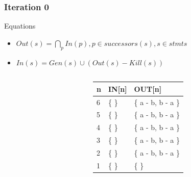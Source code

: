 \begin{frame}[fragile, t]
	\frametitle{Iteration 0} 
	
	\begin{center}
		\begin{scriptsize}
			\begin{minipage}{8cm}
				\begin{block}{Equations}
					\begin{itemize}
						\item $Out(s) = \bigcap_p In(p), p \in successors(s), s \in stmts$
						\item $In(s) = Gen(s) \cup (Out(s) - Kill(s))$  
					\end{itemize}
				\end{block}
			\end{minipage}
		\end{scriptsize}
	\end{center}
	
	\begin{columns}[T]
		\begin{column}[T]{.5\textwidth}
			\vspace{0pt}
			
		\end{column}
		\begin{column}[T]{.5\textwidth}
			\vspace{30pt}    
			\begin{scriptsize}
				\begin{table}[]
					\begin{tabular}{|l|l|l|}
						\hline
						n & IN{[}n{]} & OUT{[}n{]} \\ \hline
						6  & \{ \} & \{ a - b, b - a \}  \\ \hline
						5  & \{ \} & \{ a - b, b - a \}  \\ \hline
						4  & \{ \} & \{ a - b, b - a \}  \\ \hline
						3  & \{ \} & \{ a - b, b - a \}  \\ \hline
						2  & \{ \} & \{ a - b, b - a \} \\ \hline
						1  & \{ \} & \{ \} \\ \hline
					\end{tabular}
				\end{table}   
			\end{scriptsize}
		\end{column}
		
	\end{columns}
	
\end{frame}



